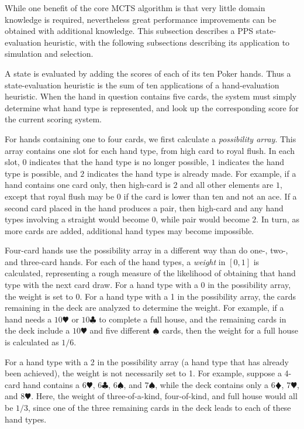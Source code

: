 \documentclass[letterpaper]{article}
\begin{document}
While one benefit of the core MCTS algorithm is that very little domain knowledge is required, nevertheless great performance improvements can be obtained with additional knowledge. This subsection describes a PPS state-evaluation heuristic, with the following subsections describing its application to simulation and selection.

A state is evaluated by adding the scores of each of its ten Poker hands. Thus a state-evaluation heuristic is the sum of ten applications of a hand-evaluation heuristic. When the hand in question contains five cards, the system must simply determine what hand type is represented, and look up the corresponding score for the current scoring system.

For hands containing one to four cards, we first calculate a {\it possibility array}. This array contains one slot for each hand type, from high card to royal flush. In each slot, $0$ indicates that the hand type is no longer possible, $1$ indicates the hand type is possible, and $2$ indicates the hand type is already made. For example, if a hand contains one card only, then high-card is $2$ and all other elements are $1$, except that royal flush may be $0$ if the card is lower than ten and not an ace. If a second card placed in the hand produces a pair, then high-card and any hand types involving a straight would become $0$, while pair would become $2$. In turn, as more cards are added, additional hand types may become impossible.

Four-card hands use the possibility array in a different way than do one-, two-, and three-card hands. For each of the hand types, a {\it weight} in $[0,1]$ is calculated, representing a rough measure of the likelihood of obtaining that hand type with the next card draw. For a hand type with a 0 in the possibility array, the weight is set to 0. For a hand type with a 1 in the possibility array, the cards remaining in the deck are analyzed to determine the weight. For example, if a hand needs a $10\varheartsuit$ or $10\clubsuit$ to complete a full house, and the remaining cards in the deck include a $10\varheartsuit$ and five different $\spadesuit$ cards, then the weight for a full house is calculated as $1 / 6$. 

For a hand type with a 2 in the possibility array (a hand type that has already been achieved), the weight is not necessarily set to 1. For example, suppose a 4-card hand contains a $6\varheartsuit$, $6\clubsuit$, $6\spadesuit$, and $7\spadesuit$, while the deck contains only a $6\vardiamondsuit$, $7\varheartsuit$, and $8\varheartsuit$. Here, the weight of three-of-a-kind, four-of-kind, and full house would all be $1/3$, since one of the three remaining cards in the deck leads to each of these hand types.
\end{document}
